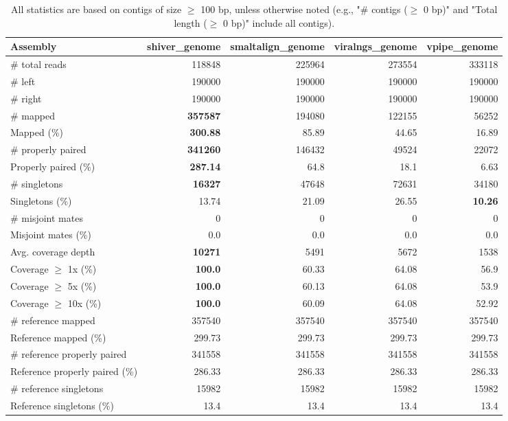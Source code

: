 \documentclass[12pt,a4paper]{article}
\begin{document}
\begin{table}[ht]
\begin{center}
\caption{All statistics are based on contigs of size $\geq$ 100 bp, unless otherwise noted (e.g., "\# contigs ($\geq$ 0 bp)" and "Total length ($\geq$ 0 bp)" include all contigs).}
\begin{tabular}{|l*{4}{|r}|}
\hline
Assembly & shiver\_genome & smaltalign\_genome & viralngs\_genome & vpipe\_genome \\ \hline
\# total reads & 118848 & 225964 & 273554 & 333118 \\ \hline
\# left & 190000 & 190000 & 190000 & 190000 \\ \hline
\# right & 190000 & 190000 & 190000 & 190000 \\ \hline
\# mapped & {\bf 357587} & 194080 & 122155 & 56252 \\ \hline
Mapped (\%) & {\bf 300.88} & 85.89 & 44.65 & 16.89 \\ \hline
\# properly paired & {\bf 341260} & 146432 & 49524 & 22072 \\ \hline
Properly paired (\%) & {\bf 287.14} & 64.8 & 18.1 & 6.63 \\ \hline
\# singletons & {\bf 16327} & 47648 & 72631 & 34180 \\ \hline
Singletons (\%) & 13.74 & 21.09 & 26.55 & {\bf 10.26} \\ \hline
\# misjoint mates & 0 & 0 & 0 & 0 \\ \hline
Misjoint mates (\%) & 0.0 & 0.0 & 0.0 & 0.0 \\ \hline
Avg. coverage depth & {\bf 10271} & 5491 & 5672 & 1538 \\ \hline
Coverage $\geq$ 1x (\%) & {\bf 100.0} & 60.33 & 64.08 & 56.9 \\ \hline
Coverage $\geq$ 5x (\%) & {\bf 100.0} & 60.13 & 64.08 & 53.9 \\ \hline
Coverage $\geq$ 10x (\%) & {\bf 100.0} & 60.09 & 64.08 & 52.92 \\ \hline
\# reference mapped & 357540 & 357540 & 357540 & 357540 \\ \hline
Reference mapped (\%) & 299.73 & 299.73 & 299.73 & 299.73 \\ \hline
\# reference properly paired & 341558 & 341558 & 341558 & 341558 \\ \hline
Reference properly paired (\%) & 286.33 & 286.33 & 286.33 & 286.33 \\ \hline
\# reference singletons & 15982 & 15982 & 15982 & 15982 \\ \hline
Reference singletons (\%) & 13.4 & 13.4 & 13.4 & 13.4 \\ \hline

\end{tabular}
\end{center}
\end{table}
\end{document}
